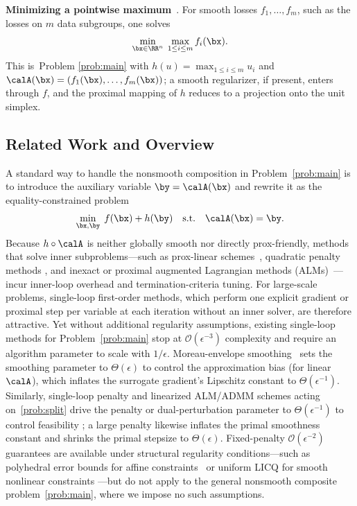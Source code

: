 \textbf{Minimizing a pointwise maximum}~\cite{zhang2020smoothed}.
For smooth losses $f_1,\dots,f_m$, such as the losses on $m$ data subgroups, one solves
\begin{equation*}
  \min_{\bx\in\RR^n}\;\max_{1\le i\le m} f_i(\bx).
\end{equation*}
This is~Problem \eqref{prob:main} with $h(u)=\max_{1\le i\le m}u_i$ and
$\calA(\bx)=(f_1(\bx),\dots,f_m(\bx))$; a smooth regularizer, if present, enters
through $f$, and the proximal mapping of $h$ reduces to a projection onto the unit
simplex.

\subsection{Related Work and Overview}

A standard way to handle the nonsmooth composition in Problem~\eqref{prob:main}
is to introduce the auxiliary variable $\by=\calA(\bx)$ and rewrite it as the
equality-constrained problem
\begin{equation}\label{prob:split}
  \min_{\bx,\by}\; f(\bx)+h(\by)\quad\text{s.t.}\quad \calA(\bx)=\by.
\end{equation}
Because $h\circ\calA$ is neither globally smooth nor directly prox-friendly,
methods that solve inner subproblems---such as prox-linear
schemes~\cite{Drusvyatskiy2019}, quadratic penalty methods
\cite{kong2019complexity,lin2022complexity}, and inexact or proximal augmented
Lagrangian methods (ALMs)~\cite{sahin2019inexact,li2021rate,xie2021proximal}---incur
inner-loop overhead and termination-criteria tuning. For large-scale problems,
single-loop first-order methods, which perform one explicit gradient or
proximal step per variable at each iteration without an inner solver, are
therefore attractive. Yet without additional regularity assumptions, existing
single-loop methods for Problem~\eqref{prob:main} stop at $\mathcal O(\epsilon^{-3})$
complexity and require an algorithm parameter to scale with $1/\epsilon$.
Moreau-envelope smoothing~\cite{bohm2021variable} sets the smoothing parameter
to $\Theta(\epsilon)$ to control the approximation bias (for linear $\calA$),
which inflates the surrogate gradient's Lipschitz constant to $\Theta(\epsilon^{-1})$.
Similarly, single-loop penalty and linearized ALM/ADMM schemes acting
on~\eqref{prob:split} drive the penalty or dual-perturbation parameter to
$\Theta(\epsilon^{-1})$ to control feasibility
\cite{hajinezhad2019perturbed,luSingleLoopGradientDescent2022,hallak2023adaptive,alacaoglu2024complexity,sun2024dual_descent_alm_admm,elbourkhissi2025perturbed,shi2025momentum};
a large penalty likewise inflates the primal smoothness constant and shrinks
the primal stepsize to $\Theta(\epsilon)$. Fixed-penalty $\mathcal O(\epsilon^{-2})$
guarantees are available under structural regularity conditions---such as
polyhedral error bounds for affine constraints~\cite{zhang2022global} or
uniform LICQ for smooth nonlinear constraints
\cite{elbourkhissi2025linearized,liu2026fixed}---but do not apply to the
general nonsmooth composite problem~\eqref{prob:main}, where we impose no such
assumptions.

